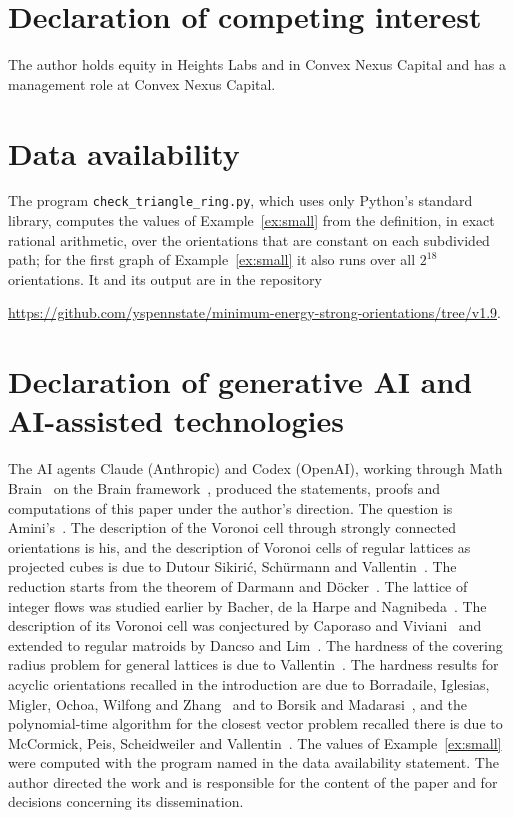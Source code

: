 \documentclass[11pt]{amsart}
\theoremstyle{definition}
\theoremstyle{remark}
\numberwithin{equation}{section}
\begin{document}
\section*{Declaration of competing interest}
The author holds equity in Heights Labs and in Convex Nexus Capital and has a management role at Convex Nexus Capital.

\section*{Data availability}
The program \texttt{check\_triangle\_ring.py}, which uses only Python's standard library, computes the values of Example~\ref{ex:small} from the definition, in exact rational arithmetic, over the orientations that are constant on each subdivided path; for the first graph of Example~\ref{ex:small} it also runs over all $2^{18}$ orientations. It and its output are in the repository
\begin{center}\url{https://github.com/yspennstate/minimum-energy-strong-orientations/tree/v1.9}.\end{center}

\section*{Declaration of generative AI and AI-assisted technologies}
The AI agents Claude (Anthropic) and Codex (OpenAI), working through Math Brain~\cite{MathBrainRepo,MathBrainPaper} on the Brain framework~\cite{BrainFramework}, produced the statements, proofs and computations of this paper under the author's direction. The question is Amini's~\cite{Amini}. The description of the Voronoi cell through strongly connected orientations is his, and the description of Voronoi cells of regular lattices as projected cubes is due to Dutour Sikiri\'c, Sch\"urmann and Vallentin~\cite{DSV09}. The reduction starts from the theorem of Darmann and D\"ocker~\cite{DD20}. The lattice of integer flows was studied earlier by Bacher, de la Harpe and Nagnibeda~\cite{BHN97}. The description of its Voronoi cell was conjectured by Caporaso and Viviani~\cite{CV10} and extended to regular matroids by Dancso and Lim~\cite{DL22}. The hardness of the covering radius problem for general lattices is due to Vallentin~\cite{Vallentin26}. The hardness results for acyclic orientations recalled in the introduction are due to Borradaile, Iglesias, Migler, Ochoa, Wilfong and Zhang~\cite{BIMOWZ17} and to Borsik and Madarasi~\cite{BM25}, and the polynomial-time algorithm for the closest vector problem recalled there is due to McCormick, Peis, Scheidweiler and Vallentin~\cite{MPSV21}. The values of Example~\ref{ex:small} were computed with the program named in the data availability statement. The author directed the work and is responsible for the content of the paper and for decisions concerning its dissemination.
\end{document}
